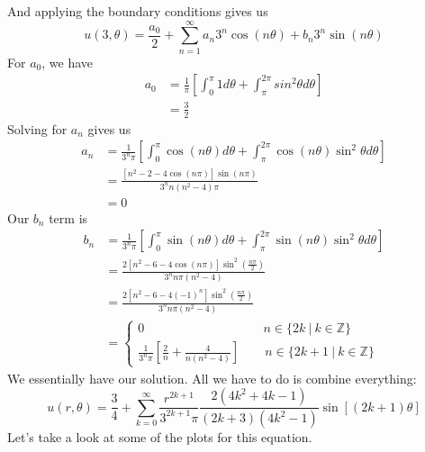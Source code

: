 And applying the boundary conditions gives us
\[
u(3,\theta) = \frac{a_{0}}{2} + \sum_{n=1}^{\infty}a_{n}3^{n}\cos{(n\theta)} + b_{n}3^{n}\sin{(n\theta)}
\]
For $a_{0}$, we have
\begin{align*}
a_{0} &= \frac{1}{\pi}\left[\int_{0}^{\pi}1 d\theta + \int_{\pi}^{2\pi}sin^{2}{\theta}d\theta\right]\\
&= \frac{3}{2}
\end{align*}
Solving for $a_{n}$ gives us
\begin{align*}
a_{n} &= \frac{1}{3^{n}\pi}\left[\int_{0}^{\pi}\cos{(n\theta)}d\theta + \int_{\pi}^{2\pi}\cos{(n\theta)}\sin^{2}{\theta}d\theta\right]\\
&= \frac{[n^{2} - 2 - 4\cos{(n\pi)}]\sin{(n\pi)}}{3^{n}n(n^{2}-4)\pi}\\
&= 0
\end{align*}
Our $b_{n}$ term is
\begin{align*}
b_{n} &= \frac{1}{3^{n}\pi}\left[\int_{0}^{\pi}\sin{(n\theta)}d\theta + \int_{\pi}^{2\pi}\sin{(n\theta)}\sin^{2}{\theta}d\theta\right]\\
&= \frac{2\left[n^{2} - 6 - 4\cos{(n\pi)}\right]\sin^{2}{\left(\frac{n\pi}{2}\right)}}{3^{n}n\pi(n^{2} - 4)}\\
&= \frac{2\left[n^{2} - 6 - 4(-1)^{n}\right]\sin^{2}{\left(\frac{n\pi}{2}\right)}}{3^{n}n\pi(n^{2} - 4)}\\
&=
\begin{cases*}
0 \qquad\qquad\qquad\qquad\quad\ \ n \in \{ 2k\ |\ k \in \mathbb{Z} \}\\
\frac{1}{3^{n}\pi}\left[\frac{2}{n} + \frac{4}{n(n^{2} - 4)}\right]\qquad n \in \{ 2k + 1\ |\ k \in \mathbb{Z} \}
\end{cases*}
\end{align*}
We essentially have our solution. All we have to do is combine everything:
\[
u(r,\theta) = \frac{3}{4} + \sum_{k=0}^{\infty}\frac{r^{2k + 1}}{3^{2k+1}\pi}\frac{2(4k^{2} + 4k -1)}{(2k + 3)(4k^{2} -1)}\sin{\left[(2k +1)\theta\right]}
\]
Let's take a look at some of the plots for this equation.\\
